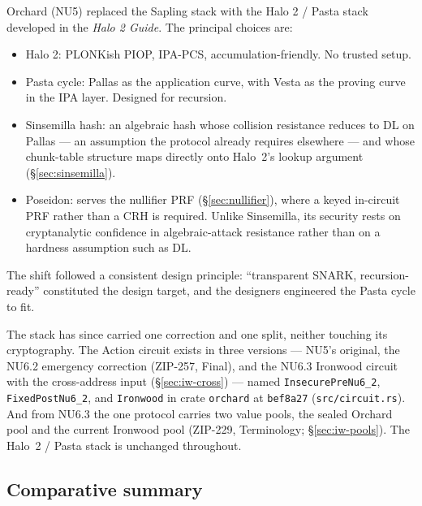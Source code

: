 \documentclass[11pt,a4paper]{article}
\theoremstyle{definition}
\begin{document}
Orchard (NU5) replaced the Sapling stack with the Halo 2 / Pasta stack
developed in the \emph{Halo 2 Guide}. The principal choices are:
\begin{itemize}[leftmargin=*]
\item Halo 2: PLONKish PIOP, IPA-PCS, accumulation-friendly. No trusted
setup.
\item Pasta cycle: Pallas as the application curve, with Vesta as the
proving curve in the IPA layer. Designed for recursion.
\item Sinsemilla hash: an algebraic hash whose collision resistance reduces
to DL on Pallas --- an assumption the protocol already requires elsewhere
--- and whose chunk-table structure maps directly onto Halo~2's lookup
argument (\S\ref{sec:sinsemilla}).
\item Poseidon: serves the nullifier PRF (\S\ref{sec:nullifier}), where a
keyed in-circuit PRF rather than a CRH is required. Unlike Sinsemilla, its
security rests on cryptanalytic confidence in algebraic-attack resistance
rather than on a hardness assumption such as DL.
\end{itemize}

The shift followed a consistent design principle: ``transparent SNARK, recursion-ready''
constituted the design target, and the designers engineered the Pasta cycle to fit.

The stack has since carried one correction and one split, neither touching
its cryptography. The Action circuit exists in three versions --- NU5's
original, the NU6.2 emergency correction (ZIP-257, Final), and the NU6.3
Ironwood circuit with the cross-address input (\S\ref{sec:iw-cross}) ---
named \texttt{InsecurePreNu6\_2}, \texttt{FixedPostNu6\_2}, and
\texttt{Ironwood} in crate \texttt{orchard} at \texttt{bef8a27}
(\texttt{src/circuit.rs}). And from NU6.3 the one protocol carries two value
pools, the sealed Orchard pool and the current Ironwood pool (ZIP-229,
Terminology; \S\ref{sec:iw-pools}). The Halo~2 / Pasta stack is unchanged
throughout.

\subsection{Comparative summary}
\end{document}
